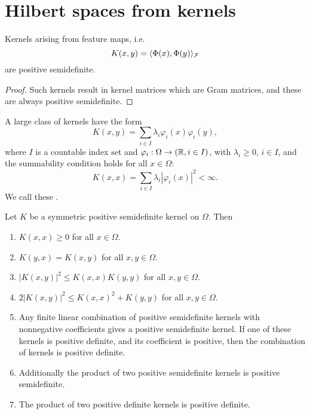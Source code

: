 \documentclass[../lecture-notes.tex]{subfiles}
\begin{document}
\section{Hilbert spaces from kernels} %
\begin{theorem} %
\label{thm:28}
Kernels arising from feature maps, i.e.
\[
	K(x, y) = \langle \Phi(x), \Phi(y) \rangle_{\mathcal{F}}
\]
are positive semidefinite.
\end{theorem}
\begin{proof}
Such kernels result in kernel matrices which are Gram matrices, and these are always positive semidefinite.
\end{proof}
\begin{remark}
A large class of kernels have the form
\[
	K(x, y) = \sum_{i \in I} \lambda_i \varphi_i(x) \varphi_i(y),
\]
where $I$ is a countable index set and $\varphi_i : \Omega \to (\mathbb{R}, i \in I)$, with $\lambda_i \geq 0$, $i \in I$, and the summability condition holds for all $x \in \Omega$:
\[
	K(x, x) = \sum_{i \in I} \lambda_i |\varphi_i(x)|^2 < \infty.
\]
We call these .
\end{remark}
\begin{theorem} %
\label{thm:29}
Let $K$ be a symmetric positive semidefinite kernel on $\Omega$. Then
\begin{enumerate}
\item\label{thm:29-1}$K(x, x) \geq 0$ for all $x \in \Omega$.
\item\label{thm:29-2} $K(y, x) = K(x, y)$ for all $x, y \in \Omega$.
\item\label{thm:29-3} $|K(x, y)|^2 \leq K(x, x) K(y, y)$ for all $x, y \in \Omega$.
\item\label{thm:29-4} $2|K(x, y)|^2 \leq K(x, x)^2 + K(y, y)$ for all $x, y \in \Omega$.
\item\label{thm:29-5} Any finite linear combination of positive semidefinite kernels with nonnegative coefficients gives a positive semidefinite kernel. If one of these kernels is positive definite, and its coefficient is positive, then the combination of kernels is positive definite.
\item\label{thm:29-6} Additionally the product of two positive semidefinite kernels is positive semidefinite.
\item\label{thm:29-7} The product of two positive definite kernels is positive definite.
\end{enumerate}
\end{theorem}
\end{document}
